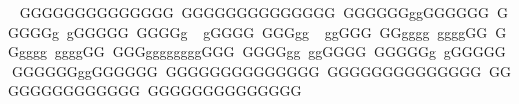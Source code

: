        G G G G G G G G G G G G G G   G G G G G G G G G G G G G G   G G G G G G g g G G G G G G   G G G G G g   g G G G G G   G G G G g     g G G G G   G G G g g     g g G G G   G G g g g g   g g g g G G   G G g g g g   g g g g G G   G G G g g g g g g g g G G G   G G G G g g   g g G G G G   G G G G G g   g G G G G G   G G G G G G g g G G G G G G   G G G G G G G G G G G G G G   G G G G G G G G G G G G G G   G G G G G G G G G G G G G G   G G G G G G G G G G G G G G                                                                                                                                                                                                                                                                  